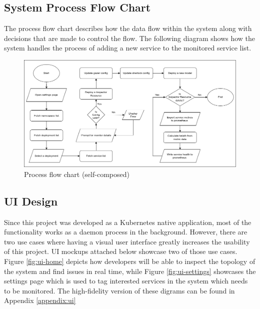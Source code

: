 \subsection{System Process Flow Chart}

The process flow chart describes how the data flow within the system along with decisions that are made to control the flow. The following diagram shows how the system handles the process of adding a new service to the monitored service list.

\begin{figure}[H]
    \includegraphics[width=16cm]{assets/system-design/process-flow-chart.png}
    \caption{Process flow chart (self-composed)}
\end{figure}

\subsection{UI Design}

Since this project was developed as a Kubernetes native application, most of the functionality works as a daemon process in the background. However, there are two use cases where having a visual user interface greatly increases the usability of this project. UI mockups attached below showcase two of those use cases. Figure \ref{fig:ui-home} depicts how developers will be able to inspect the topology of the system and find issues in real time, while Figure \ref{fig:ui-settings} showcases the settings page which is used to tag interested services in the system which needs to be monitored. The high-fidelity version of these digrams can be found in Appendix \ref{appendix:ui}

